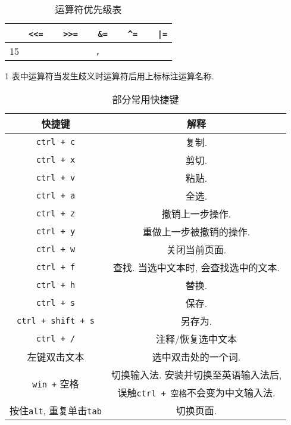 \begin{table}[htbp]
\begin{threeparttable}
\begin{tabular}{|c|c|}
                        & \texttt{<<=} \ \ \ \texttt{>>=} \ \ \ \texttt{\&=} \ \ \ \texttt{\^{}=} \ \ \ \texttt{|=} \\
                \hline
                15      & \texttt{,} \\
                \hline
            \end{tabular}
            \begin{tablenotes}
                \item[1] 表中运算符当发生歧义时运算符后用上标标注运算名称.
            \end{tablenotes}
            \caption{运算符优先级表} \label{运算符优先级表} 
        \end{threeparttable}
    \end{table}

    \begin{table}[htbp]
        \centering
        \renewcommand\arraystretch{1.5}
        \begin{tabular}{|c|c|}
            \hline
            快捷键 & 解释 \\
            \hline \hline
            \texttt{ctrl + c} & 复制. \\
            \hline
            \texttt{ctrl + x} & 剪切. \\
            \hline
            \texttt{ctrl + v} & 粘贴. \\
            \hline
            \texttt{ctrl + a} & 全选. \\
            \hline
            \texttt{ctrl + z} & 撤销上一步操作. \\
            \hline
            \texttt{ctrl + y} & 重做上一步被撤销的操作. \\
            \hline
            \texttt{ctrl + w} & 关闭当前页面. \\
            \hline
            \texttt{ctrl + f} & 查找. 当选中文本时, 会查找选中的文本. \\
            \hline
            \texttt{ctrl + h} & 替换. \\
            \hline
            \texttt{ctrl + s} & 保存. \\
            \hline
            \texttt{ctrl + shift + s} & 另存为. \\
            \hline
            \texttt{ctrl + /} & 注释/恢复选中文本 \\
            \hline
            左键双击文本 & 选中双击处的一个词. \\
            \hline
            \multirow{2}{*}{\texttt{win +} 空格} & 切换输入法. 安装并切换至英语输入法后, \\
                                                & 误触\texttt{ctrl + 空格}不会变为中文输入法. \\
            \hline
            按住\texttt{alt}, 重复单击\texttt{tab} & 切换页面. \\
            \hline
        \end{tabular}
        \caption{部分常用快捷键} \label{部分常用快捷键} 
    \end{table}